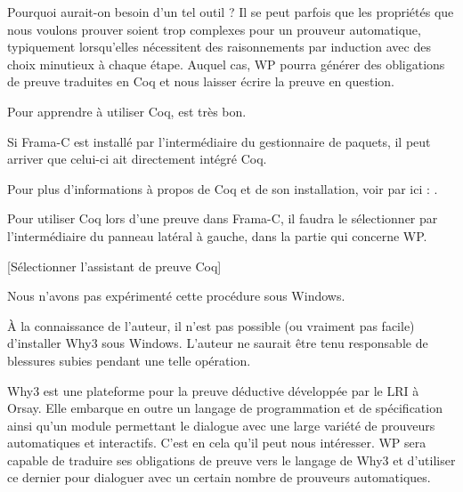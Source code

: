 Pourquoi aurait-on besoin d'un tel outil ? Il se peut parfois que les 
propriétés que nous voulons prouver soient trop complexes pour un prouveur 
automatique, typiquement lorsqu'elles nécessitent des raisonnements par
induction avec des choix minutieux à chaque étape. Auquel cas, WP pourra 
générer des obligations de preuve traduites en Coq et nous laisser écrire 
la preuve en question.



Pour apprendre à utiliser Coq, 
est très bon.



\begin{Information}
Si Frama-C est installé par l'intermédiaire du gestionnaire de 
paquets, il peut arriver que celui-ci ait directement intégré Coq.
\end{Information}


Pour plus d'informations à propos de Coq et de son installation, voir par 
ici : .



Pour utiliser Coq lors d'une preuve dans Frama-C, il faudra le sélectionner 
par l'intermédiaire du panneau latéral à gauche, dans la partie qui concerne
WP.



[Sélectionner l'assistant de preuve Coq]


\begin{Information}
Nous n'avons pas expérimenté cette procédure sous Windows.
\end{Information}




\begin{Warning}
À la connaissance de l'auteur, il n'est pas possible (ou vraiment pas facile) 
d'installer Why3 sous Windows.
L'auteur ne saurait être tenu responsable de blessures subies
pendant une telle opération.
\end{Warning}


Why3 est une plateforme pour la preuve déductive développée par le LRI à Orsay. 
Elle embarque en outre un langage de programmation et de spécification ainsi 
qu'un module permettant le dialogue avec une large variété de prouveurs 
automatiques et interactifs. C'est en cela qu'il peut nous intéresser. WP sera
capable de traduire ses obligations de preuve vers le langage de Why3 et 
d'utiliser ce dernier pour dialoguer avec un certain nombre de prouveurs 
automatiques.



